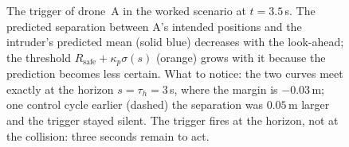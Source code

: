 \begin{algorithm}[htb]
\caption{The safety-horizon trigger}
\label{alg:ch24-trigger}
\end{algorithm}

\begin{figure}[tb]
  \centering
  \caption{The trigger of drone~A in the worked scenario at $t = 3.5$\,s.
  The predicted separation between A's intended positions and the intruder's
  predicted mean (solid blue) decreases with the look-ahead; the threshold
  $R_{\mathrm{safe}} + \kappa_p\sigma(s)$ (orange) grows with it because the
  prediction becomes less certain. What to notice: the two curves meet
  exactly at the horizon $s = \tau_h = 3$\,s, where the margin is
  $-0.03$\,m; one control cycle earlier (dashed) the separation was $0.05$\,m
  larger and the trigger stayed silent. The trigger fires at the horizon,
  not at the collision: three seconds remain to act.}
  \label{fig:ch24-horizon}
\end{figure}

